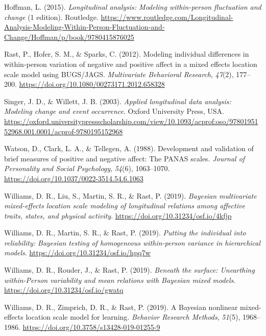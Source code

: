 \documentclass[]{article}
\begin{document}
\leavevmode\hypertarget{ref-hoffmanLongitudinalAnalysisModeling2015}{}%
Hoffman, L. (2015). \emph{Longitudinal analysis: Modeling within-person
fluctuation and change} (1 edition). Routledge.
\url{https://www.routledge.com/Longitudinal-Analysis-Modeling-Within-Person-Fluctuation-and-Change/Hoffman/p/book/9780415876025}

\leavevmode\hypertarget{ref-rastModelingIndividualDifferences2012}{}%
Rast, P., Hofer, S. M., \& Sparks, C. (2012). Modeling individual
differences in within-person variation of negative and positive affect
in a mixed effects location scale model using BUGS/JAGS.
\emph{Multivariate Behavioral Research}, \emph{47}(2), 177--200.
\url{https://doi.org/10.1080/00273171.2012.658328}

\leavevmode\hypertarget{ref-singerAppliedLongitudinalData2003}{}%
Singer, J. D., \& Willett, J. B. (2003). \emph{Applied longitudinal data
analysis: Modeling change and event occurrence}. Oxford University
Press, USA.
\url{https://oxford.universitypressscholarship.com/view/10.1093/acprof:oso/9780195152968.001.0001/acprof-9780195152968}

\leavevmode\hypertarget{ref-watsonPANASDevelopment1988}{}%
Watson, D., Clark, L. A., \& Tellegen, A. (1988). Development and
validation of brief measures of positive and negative affect: The PANAS
scales. \emph{Journal of Personality and Social Psychology},
\emph{54}(6), 1063--1070.
\url{https://doi.org/10.1037/0022-3514.54.6.1063}

\leavevmode\hypertarget{ref-williamsBayesianMultivariateMixedeffects2019a}{}%
Williams, D. R., Liu, S., Martin, S. R., \& Rast, P. (2019).
\emph{Bayesian multivariate mixed-effects location scale modeling of
longitudinal relations among affective traits, states, and physical
activity}. \url{https://doi.org/10.31234/osf.io/4kfjp}

\leavevmode\hypertarget{ref-williamsPuttingIndividualReliability2019}{}%
Williams, D. R., Martin, S. R., \& Rast, P. (2019). \emph{Putting the
individual into reliability: Bayesian testing of homogeneous
within-person variance in hierarchical models}.
\url{https://doi.org/10.31234/osf.io/hpq7w}

\leavevmode\hypertarget{ref-williamsSurfaceUnearthingWithinperson2019}{}%
Williams, D. R., Rouder, J., \& Rast, P. (2019). \emph{Beneath the
surface: Unearthing within-Person variability and mean relations with
Bayesian mixed models}. \url{https://doi.org/10.31234/osf.io/gwatq}

\leavevmode\hypertarget{ref-williamsBayesianNonlinearMixedeffects2019a}{}%
Williams, D. R., Zimprich, D. R., \& Rast, P. (2019). A Bayesian
nonlinear mixed-effects location scale model for learning.
\emph{Behavior Research Methods}, \emph{51}(5), 1968--1986.
\url{https://doi.org/10.3758/s13428-019-01255-9}
\end{document}
